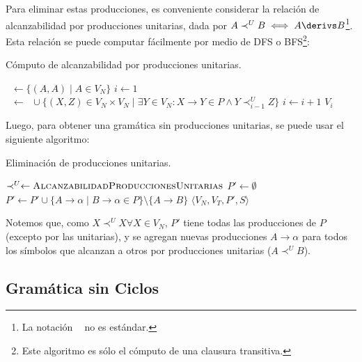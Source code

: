 Para eliminar estas producciones, es conveniente considerar la relación de alcanzabilidad por producciones unitarias, dada por $A \prec^U B \iff A \derivs B$\footnote{La notación $\mathop{\prec^U}$ no es estándar.}. Esta relación se puede computar fácilmente por medio de DFS o BFS\footnote{Este algoritmo es sólo el cómputo de una clausura transitiva.}:
\begin{algorithm}[H]
    \caption{Cómputo de alcanzabilidad por producciones unitarias.}
    \label{alcanzabilidad-unitarias}
    \begin{algorithmic}[1]
        \State $\mathop{\prec^U_0} \gets \{(A, A) \mid A \in V_N\}$
        \State $i \gets 1$
        \Repeat
        \State $\mathop{\prec^U_i} \gets \mathop{\prec^U_0} \cup \{(X, Z) \in V_N \times V_N \mid \exists Y \in V_N : X \to Y \in P \land Y \prec^U_{i - 1} Z\}$
        \State $i \gets i + 1$
        \State \Return $V_i$
        \EndProcedure
    \end{algorithmic}
\end{algorithm}

Luego, para obtener una gramática sin producciones unitarias, se puede usar el siguiente algoritmo:

\begin{algorithm}[H]
    \caption{Eliminación de producciones unitarias.}
    \label{producciones-unitarias}
    \begin{algorithmic}[1]
        \State $\prec^U \gets \textsc{AlcanzabilidadProduccionesUnitarias}$
        \State $P' \gets \emptyset$
        \State $P' \gets P' \cup \{A \to \alpha \mid B \to \alpha \in P\} \setminus \{A \to B\}$
        \EndFor
        \State \Return $\langle V_N, V_T, P', S \rangle$
        \EndProcedure
    \end{algorithmic}
\end{algorithm}

Notemos que, como $X \prec^U X \forall X \in V_N$, $P'$ tiene todas las producciones de $P$ (excepto por las unitarias), y se agregan nuevas producciones $A \to \alpha$ para todos los símbolos que alcanzan a otros por producciones unitarias ($A \prec^U B$).

\subsection{Gramática sin Ciclos}

